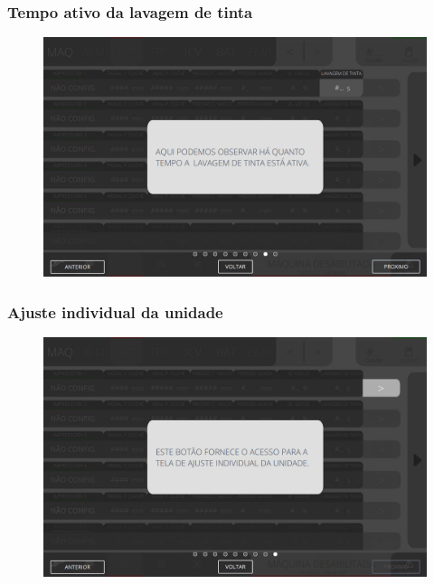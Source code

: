 \newpage
\thispagestyle{fancy}
\vspace*{40 pt}
\subsubsection{\small{Tempo ativo da lavagem de tinta}} \label{sec:telaAjustesImpressorasTempoAtivoLavagemTinta}
\vspace*{\fill}
\begin{figure}[h]
    \centering
    \includegraphics[width=576 px,height=360 px]{src/imagesICV/04-printters/01-printters/settings/8.png}
\end{figure}
\vspace*{\fill}

\newpage
\thispagestyle{fancy}
\vspace*{40 pt}
\subsubsection{\small{Ajuste individual da unidade}} \label{sec:telaAjustesImpressorasAjusteIndividualUnidade}
\vspace*{\fill}
\begin{figure}[h]
    \centering
    \includegraphics[width=576 px,height=360 px]{src/imagesICV/04-printters/01-printters/settings/9.png}
\end{figure}
\vspace*{\fill}

